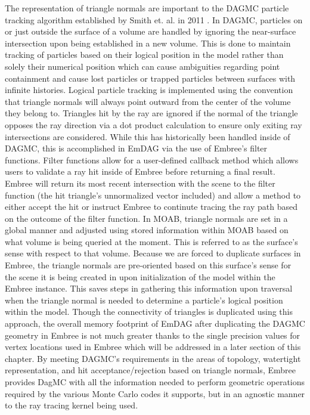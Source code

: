 \documentclass[12pt, a4paper]{article}
\begin{document}
The representation of triangle normals are important to the DAGMC particle tracking algorithm established by Smith et. al. in 2011  \cite{Smith_2011}. In DAGMC, particles on or just outside the surface of a volume are handled by ignoring the near-surface intersection upon being established in a new volume. This is done to maintain tracking of particles based on their logical position in the model rather than solely their numerical position which can cause ambiguities regarding point containment and cause lost particles or trapped particles between surfaces with infinite histories. Logical particle tracking is implemented using the convention that triangle normals will always point outward from the center of the volume they belong to. Triangles hit by the ray are ignored if the normal of the triangle opposes the ray direction via a dot product calculation to ensure only exiting ray intersections are considered. While this has historically been handled inside of DAGMC, this is accomplished in EmDAG via the use of Embree's filter functions. Filter functions allow for a user-defined callback method which allows users to validate a ray hit inside of Embree before returning a final result. Embree will return its most recent intersection with the scene to the filter function (the hit triangle's unnormalized vector included) and allow a method to either accept the hit or instruct Embree to continute tracing the ray path based on the outcome of the filter function. In MOAB, triangle normals are set in a global manner and adjusted using stored information within MOAB based on what volume is being queried at the moment. This is referred to as the surface's sense with respect to that volume. Because we are forced to duplicate surfaces in Embree, the triangle normals are pre-oriented based on this surface's sense for the scene it is being created in upon initialization of the model within the Embree instance. This saves steps in gathering this information upon traversal when the triangle normal is needed to determine a particle's logical position within the model. Though the connectivity of triangles is duplicated using this approach, the overall memory footprint of EmDAG after duplicating the DAGMC geometry in Embree is not much greater thanks to the single precision values for vertex locations used in Embree which will be addressed in a later section of this chapter.
By meeting DAGMC's requirements in the areas of topology, watertight representation, and hit acceptance/rejection based on triangle normals, Embree provides DagMC with all the information needed to perform geometric operations required by the various Monte Carlo codes it supports, but in an agnostic manner to the ray tracing kernel being used.
\end{document}
